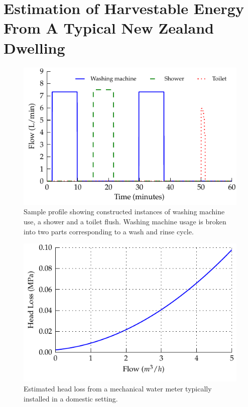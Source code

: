 \documentclass[10pt,final,journal]{IEEEtran}
\begin{document}
    \section{Estimation of Harvestable Energy From A Typical New Zealand Dwelling}
    \label{sect:waterConsumption}
    \begin{figure}
        \begin{center}
        \includegraphics[width=\linewidth]{graph_profile}
        \end{center}
        \caption{Sample profile showing constructed instances of washing machine use, a shower and a toilet flush.
        Washing machine usage is broken into two parts corresponding to a wash and rinse cycle.}
        \label{fig:profileSample}
    \end{figure}

    \begin{figure}
        \begin{center}
        \includegraphics[width=\linewidth]{graph_pressureLoss}
        \end{center}
        \caption{Estimated head loss from a mechanical water meter typically installed in a domestic setting.}
        \label{fig:headloss}
    \end{figure}
\end{document}
